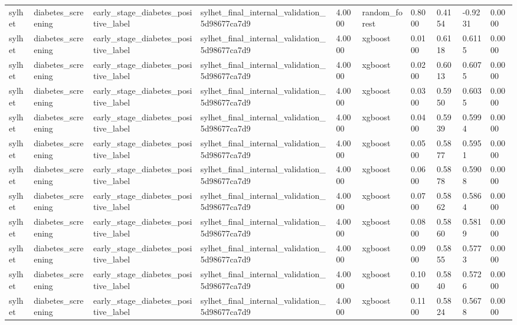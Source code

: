 \begin{tabular}{llllllllll}
sylhet & diabetes\_screening & early\_stage\_diabetes\_positive\_label & sylhet\_final\_internal\_validation\_5d98677ca7d9 & 4.0000 & random\_forest & 0.8000 & 0.4154 & -0.9231 & 0.0000 \\
sylhet & diabetes\_screening & early\_stage\_diabetes\_positive\_label & sylhet\_final\_internal\_validation\_5d98677ca7d9 & 4.0000 & xgboost & 0.0100 & 0.6118 & 0.6115 & 0.0000 \\
sylhet & diabetes\_screening & early\_stage\_diabetes\_positive\_label & sylhet\_final\_internal\_validation\_5d98677ca7d9 & 4.0000 & xgboost & 0.0200 & 0.6013 & 0.6075 & 0.0000 \\
sylhet & diabetes\_screening & early\_stage\_diabetes\_positive\_label & sylhet\_final\_internal\_validation\_5d98677ca7d9 & 4.0000 & xgboost & 0.0300 & 0.5950 & 0.6035 & 0.0000 \\
sylhet & diabetes\_screening & early\_stage\_diabetes\_positive\_label & sylhet\_final\_internal\_validation\_5d98677ca7d9 & 4.0000 & xgboost & 0.0400 & 0.5939 & 0.5994 & 0.0000 \\
sylhet & diabetes\_screening & early\_stage\_diabetes\_positive\_label & sylhet\_final\_internal\_validation\_5d98677ca7d9 & 4.0000 & xgboost & 0.0500 & 0.5877 & 0.5951 & 0.0000 \\
sylhet & diabetes\_screening & early\_stage\_diabetes\_positive\_label & sylhet\_final\_internal\_validation\_5d98677ca7d9 & 4.0000 & xgboost & 0.0600 & 0.5878 & 0.5908 & 0.0000 \\
sylhet & diabetes\_screening & early\_stage\_diabetes\_positive\_label & sylhet\_final\_internal\_validation\_5d98677ca7d9 & 4.0000 & xgboost & 0.0700 & 0.5862 & 0.5864 & 0.0000 \\
sylhet & diabetes\_screening & early\_stage\_diabetes\_positive\_label & sylhet\_final\_internal\_validation\_5d98677ca7d9 & 4.0000 & xgboost & 0.0800 & 0.5860 & 0.5819 & 0.0000 \\
sylhet & diabetes\_screening & early\_stage\_diabetes\_positive\_label & sylhet\_final\_internal\_validation\_5d98677ca7d9 & 4.0000 & xgboost & 0.0900 & 0.5855 & 0.5773 & 0.0000 \\
sylhet & diabetes\_screening & early\_stage\_diabetes\_positive\_label & sylhet\_final\_internal\_validation\_5d98677ca7d9 & 4.0000 & xgboost & 0.1000 & 0.5840 & 0.5726 & 0.0000 \\
sylhet & diabetes\_screening & early\_stage\_diabetes\_positive\_label & sylhet\_final\_internal\_validation\_5d98677ca7d9 & 4.0000 & xgboost & 0.1100 & 0.5824 & 0.5678 & 0.0000 \\

\end{tabular}
